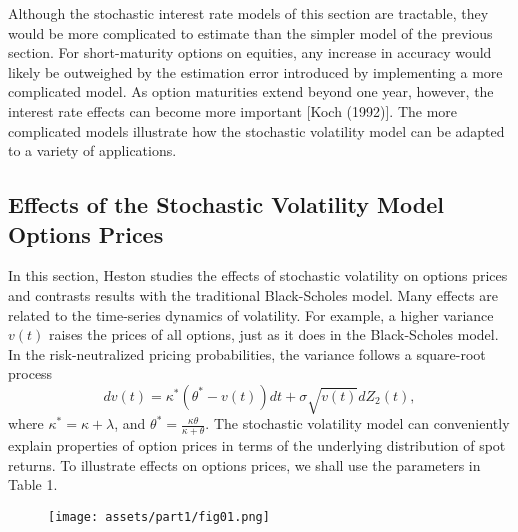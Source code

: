     \begin{frame}
        Although  the  stochastic  interest  rate  models  of  this  section  are
        tractable,  they  would  be  more  complicated  to  estimate  than  the  
        simpler  model  of  the  previous  section.  For  short-maturity  options  
        on equities,  any  increase  in  accuracy  would  likely  be  outweighed  by  the
        estimation  error  introduced  by  implementing  a  more  complicated
        model.  As  option  maturities  extend  beyond  one  year,  however,  the
        interest  rate  effects  can  become  more  important  [Koch  (1992)].  The
        more  complicated  models  illustrate  how  the  stochastic  volatility  model
        can  be  adapted  to  a  variety  of  applications.
    \end{frame}

\subsection{Effects  of  the  Stochastic  Volatility  Model  Options  Prices}

    \begin{frame}
        In  this  section,  Heston  studies  the  effects  of  stochastic  volatility  
        on  options prices  and  contrasts  results  with  the traditional Black-Scholes  model.  
        Many  effects are  related  to  the  time-series  dynamics  of  volatility.  
        For  example,  a higher  variance  $v(t)$  raises  the  prices  of  all  options,  
        just  as  it  does  in the   Black-Scholes   model.   
        In   the   risk-neutralized   pricing   probabilities,  the  variance  
        follows  a  square-root  process
        \begin{equation}
            dv(t) = \kappa^* \left(\theta^* - v(t)\right)dt + \sigma \sqrt{v(t)}dZ_2(t),
        \end{equation}
        where $\kappa^* = \kappa + \lambda$, and $\theta^* = \frac{\kappa\theta}{\kappa+\theta}$.
        The stochastic volatility model can conveniently explain properties of option prices in 
        terms of the underlying distribution of spot returns. To illustrate effects on options 
        prices, we shall use the parameters in Table 1.
    \end{frame}

    \begin{frame}
        \begin{figure}
            \texttt{[image: assets/part1/fig01.png]}
        \end{figure}
    \end{frame}

